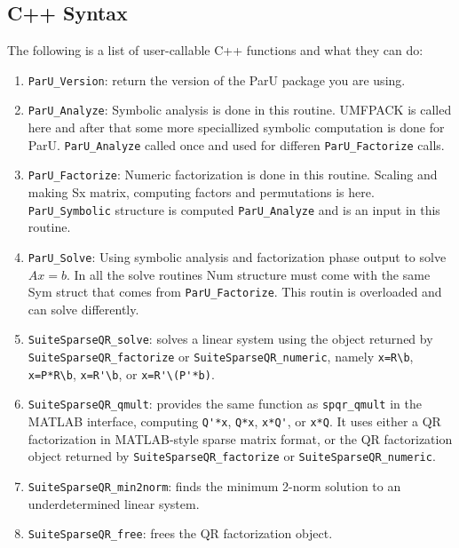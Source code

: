 \documentclass[12pt]{article}
\begin{document}
\subsection{C++ Syntax}

The following is a list of user-callable C++ functions and what they
can do:

\begin{enumerate}

    \item \verb'ParU_Version': return the version of the ParU package 
        you are using.

    \item \verb'ParU_Analyze': Symbolic analysis is done in this routine. 
        UMFPACK is called here and after that some more speciallized symbolic
        computation is done for ParU. 
        \verb'ParU_Analyze' called once and used for differen 
        \verb'ParU_Factorize'
        calls.
    \item \verb'ParU_Factorize': 
        Numeric factorization is done in this routine. Scaling and
        making Sx matrix, computing factors and permutations is here. 
        \verb'ParU_Symbolic' structure is computed \verb'ParU_Analyze' 
        and is an input in this routine.

    \item \verb'ParU_Solve':  
        Using symbolic analysis and factorization phase output to solve $Ax=b$.
        In all the solve routines Num structure must come with the same 
        Sym struct that comes from \verb'ParU_Factorize'. 
        This routin is overloaded and can solve differently.


    \item \verb'SuiteSparseQR_solve': solves a linear system using the object
    returned by \newline \verb'SuiteSparseQR_factorize' or
    \verb'SuiteSparseQR_numeric', namely \verb"x=R\b", \newline \verb"x=P*R\b",
    \verb"x=R'\b", or \verb"x=R'\(P'*b)".

    \item \verb'SuiteSparseQR_qmult': provides the same function as
    \verb'spqr_qmult' in the MATLAB interface, computing
    \verb"Q'*x", \verb"Q*x", \verb"x*Q'", or \verb"x*Q".
    It uses either a QR factorization
    in MATLAB-style sparse matrix format, or the QR factorization object
    returned by \newline \verb'SuiteSparseQR_factorize' or
    \verb'SuiteSparseQR_numeric'.

    \item \verb'SuiteSparseQR_min2norm': finds the minimum 2-norm solution to
    an underdetermined linear system.

    \item \verb'SuiteSparseQR_free': frees the QR factorization object.

\end{enumerate}
\end{document}
